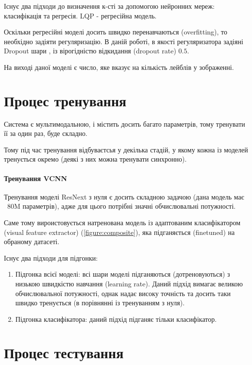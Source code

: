 \documentclass{udstu}
\begin{document}
Існує два підходи до визначення к-сті за допомогою нейронних мереж: класифікація та регресія.
LQP - регресійна модель.

Оскільки регресійні моделі досить швидко перенавчаються (overfitting), то необхідно задіяти регуляризацію.
В даній роботі, в якості регуляризатора задіяні Dropout шари \cite{dropout}, із вірогідністю відкидання (dropout rate) $0.5$.

На виході даної моделі є число, яке вказує на кількість лейблів у зображенні.


\section{Процес тренування}

Система є мультимодальною, і містить досить багато параметрів, тому тренувати її за один раз, буде складно.

Тому під час тренування відбуваєтсья у декілька стадій, у якому кожна із моделей тренується окремо
(деякі з них можна тренувати синхронно).


\paragraph{\textbf{Тренування VCNN}\\}

Тренування моделі ResNext \cite{resnext} з нуля є досить складною задачою (дана модель має ~80M параметрів),
адже для цього потрібні значні обчислювальні потужності.

Саме тому вироистовується натренована модель із адаптованим класифікатором (visual feature extractor) (\figurename{\ref{figure:composite}}), яка підганяється (finetuned) на обраному датасеті.

Існує два підходи для підгонки:

\begin{enumerate}[1)]
	\item Підгонка всієї моделі:
	всі шари моделі підганяються (дотреновуються) з низькою швидкістю навчання (learning rate).
	Даний підхід вимагає великою обчислювальної потужності, однак надає високу точність та
	досить таки швидко тренується (в порівнянні із тренуванням з нуля).

	\item Підгонка класифікатора:
	даний підхід підганяє тільки класифікатор.
\end{enumerate}



\section{Процес тестування}


\conclusions

\printbibliography

\end{document}
